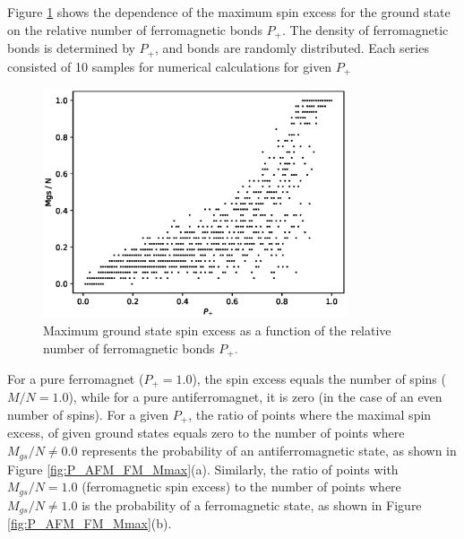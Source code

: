 \documentclass[preprint,12pt]{elsarticle}
\begin{document}
	Figure \ref{fig:Mgs(P+)} shows the dependence of the maximum spin excess for the ground state on the relative number of ferromagnetic bonds $P_+$. The density of ferromagnetic bonds is determined by $P_+$, and bonds are randomly distributed. Each series consisted of 10 samples for numerical calculations for given $P_+$
	
	\begin{figure}[H]
		\centering
		\includegraphics[width=0.8\textwidth]{images/Mgs(P+).eps}
		\caption{Maximum ground state spin excess as a function of the relative number of ferromagnetic bonds $P_+$\textcolor{red}{.}}
		\label{fig:Mgs(P+)}
	\end{figure}
	
	For a pure ferromagnet ($P_+ = 1.0$), the spin excess equals the number of spins ($M/N = 1.0$), while for a pure antiferromagnet, it is zero (in the case of an even number of spins). For a given $P_+$, the ratio of points where the maximal spin excess, of given ground states equals zero to the number of points where $M_{gs}/N \neq 0.0$ represents the probability of an antiferromagnetic state, as shown in Figure \ref{fig:P_AFM_FM_Mmax}(a). Similarly, the ratio of points with $M_{gs}/N = 1.0$ (ferromagnetic spin excess) to the number of points where $M_{gs}/N \neq 1.0$ is the probability of a ferromagnetic state, as shown in Figure \ref{fig:P_AFM_FM_Mmax}(b).
	
\end{document}
